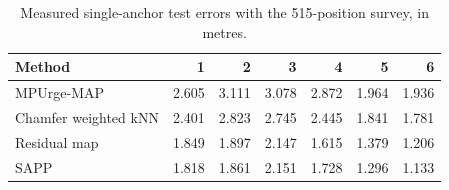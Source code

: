 \begin{table}[ht]
\centering
\caption{Measured single-anchor test errors with the 515-position survey, in metres.}
\label{tab:uwbanchors}
\begin{tabular}{lrrrrrr}
\toprule
Method & 1 & 2 & 3 & 4 & 5 & 6\\
\midrule
MPUrge-MAP & 2.605 & 3.111 & 3.078 & 2.872 & 1.964 & 1.936\\
Chamfer weighted kNN & 2.401 & 2.823 & 2.745 & 2.445 & 1.841 & 1.781\\
Residual map & 1.849 & 1.897 & 2.147 & 1.615 & 1.379 & 1.206\\
SAPP & 1.818 & 1.861 & 2.151 & 1.728 & 1.296 & 1.133\\
\bottomrule
\end{tabular}
\end{table}
